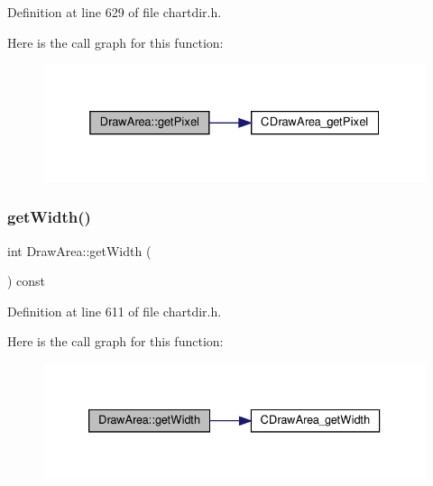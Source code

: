 Definition at line 629 of file chartdir.\+h.

Here is the call graph for this function\+:
\nopagebreak
\begin{figure}[H]
\begin{center}
\leavevmode
\includegraphics[width=325pt]{class_draw_area_af2420b0129e8e79b455c507f017c8c7d_cgraph}
\end{center}
\end{figure}
\mbox{\label{class_draw_area_ac0a00686b4de7b6e196548d233dc0a36}} 
\subsubsection{\texorpdfstring{get\+Width()}{getWidth()}}
{\footnotesize\ttfamily int Draw\+Area\+::get\+Width (\begin{DoxyParamCaption}{ }\end{DoxyParamCaption}) const\hspace{0.3cm}{\ttfamily [inline]}}



Definition at line 611 of file chartdir.\+h.

Here is the call graph for this function\+:
\nopagebreak
\begin{figure}[H]
\begin{center}
\leavevmode
\includegraphics[width=333pt]{class_draw_area_ac0a00686b4de7b6e196548d233dc0a36_cgraph}
\end{center}
\end{figure}
\mbox{\label{class_draw_area_a381c8ba9c40cb44ccd70487b16069d2e}} 
